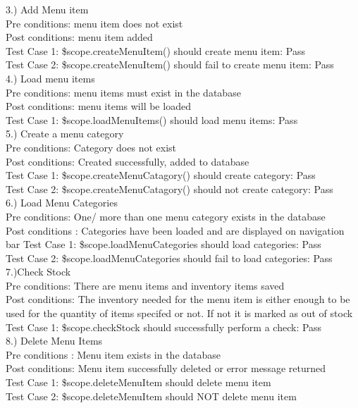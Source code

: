 \documentclass[a4paper,12pt]{report}
\begin{document}
3.) Add Menu item \\
Pre conditions: menu item does not exist\\
Post conditions: menu item added\\
Test Case 1: \$scope.createMenuItem() should create menu item: Pass\\
Test Case 2: \$scope.createMenuItem() should fail to create menu item: Pass\\

4.) Load menu items \\
Pre conditions: menu items must exist in the database\\
Post conditions: menu items will be loaded \\
Test Case 1: \$scope.loadMenuItems() should load menu items: Pass \\ 

5.) Create a menu category \\ 
Pre conditions: Category does not exist \\
Post conditions: Created successfully, added to database\\
Test Case 1: \$scope.createMenuCatagory() should create category: Pass \\
Test Case 2: \$scope.createMenuCatagory() should not create category: Pass \\

6.) Load Menu Categories \\
Pre conditions: One/ more than one menu category exists in the database \\
Post conditions : Categories have been loaded and are displayed on navigation bar 
Test Case 1: \$scope.loadMenuCategories should load categories: Pass \\
Test Case 2: \$scope.loadMenuCategories should fail to load categories: Pass \\

7.)Check Stock \\
Pre conditions: There are menu items and inventory items saved\\
Post conditions: The inventory needed for the menu item is either enough to be used for the quantity of items specifed or not. If not it is marked as out of stock\\
Test Case 1: \$scope.checkStock should successfully perform a check: Pass \\  

8.) Delete Menu Items \\
Pre conditions : Menu item exists in the database \\
Post conditions: Menu item successfully deleted or error message returned \\
Test Case 1: \$scope.deleteMenuItem should delete menu item \\
Test Case 2: \$scope.deleteMenuItem should NOT delete menu item\\
\end{document}
